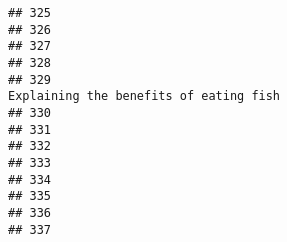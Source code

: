 \documentclass[
]{article}
\begin{document}
\begin{verbatim}
## 325                                                                                                                                                                                                             
## 326                                                                                                                                                                                                             
## 327                                                                                                                                                                                                             
## 328                                                                                                                                                                                                             
## 329                                                                                                                                                                       Explaining the benefits of eating fish
## 330                                                                                                                                                                                                             
## 331                                                                                                                                                                                                             
## 332                                                                                                                                                                                                             
## 333                                                                                                                                                                                                             
## 334                                                                                                                                                                                                             
## 335                                                                                                                                                                                                             
## 336                                                                                                                                                                                                             
## 337                                                                                                                                                                                                             

\end{verbatim}
\end{document}
